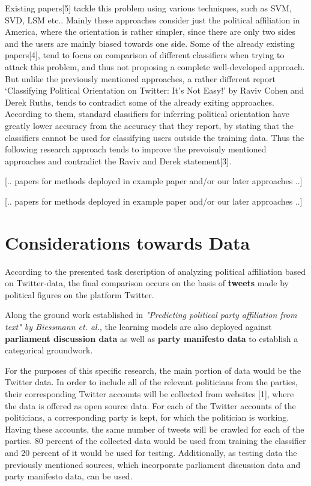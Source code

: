 \documentclass[10pt, oneside]{article}
\begin{document}
Existing papers[5] tackle this problem using various techniques, such as SVM, SVD, LSM etc.. Mainly these approaches consider just the political affiliation in America, where the orientation is rather simpler, since there are only two sides and the users are mainly biased towards one side. Some of the already existing papers[4], tend to focus on comparison of different classifiers when trying to attack this problem, and thus not proposing a complete well-developed approach.
But unlike the previously mentioned approaches, a rather different report ‘Classifying Political Orientation on Twitter: It’s Not Easy!’ by Raviv Cohen and Derek Ruths, tends to contradict some of the already exiting approaches. According to them, standard classifiers for inferring political orientation have greatly lower accuracy from the accuracy that they report, by stating that the classifiers cannot be used for classifying users outside the training data. Thus the following research approach tends to improve the prevoisuly mentioned approaches and contradict the Raviv and Derek statement[3].

[.. papers for methods deployed in example paper and/or our later approaches ..]

[.. papers for methods deployed in example paper and/or our later approaches ..]



\section{Considerations towards Data}

According to the presented task description of analyzing political affiliation based on Twitter-data, the final comparison occurs on the basis of \textbf{tweets} made by political figures on the platform Twitter.

Along the ground work established in \textit{"Predicting political party affiliation from text" by Biessmann et. al.}, the learning models are also deployed against \textbf{parliament discussion data} as well as \textbf{party manifesto data} to establish a categorical groundwork.



For the purposes of this specific research, the main portion of data would be the Twitter data. In order to include all of the relevant politicians from the parties, their corresponding Twitter accounts will be collected from websites [1], where the data is offered as open source data.
For each of the Twitter accounts of the politicians, a corresponding party is kept, for which the politician is working. Having these accounts, the same number of tweets will be crawled for each of the parties. 80 percent of the collected data would be used from training the classifier and 20 percent of it would be used for testing.
Additionally, as testing data the previously mentioned sources, which incorporate parliament discussion data and party manifesto data, can be used. 
\end{document}
